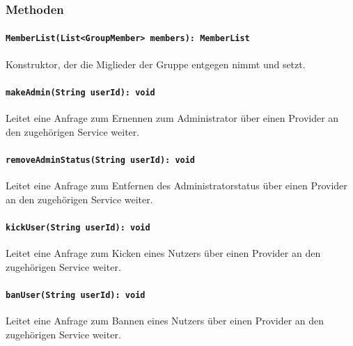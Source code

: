 \documentclass{entwurfsheft}
\begin{document}
\subsubsection*{Methoden}
\paragraph{\texttt{MemberList(List<GroupMember> members): MemberList}}
Konstruktor, der die Miglieder der Gruppe entgegen nimmt und setzt.
\paragraph{\texttt{makeAdmin(String userId): void}}
Leitet eine Anfrage zum Ernennen zum Administrator über einen Provider an den zugehörigen Service weiter.
\paragraph{\texttt{removeAdminStatus(String userId): void}}
Leitet eine Anfrage zum Entfernen des Administratorstatus über einen Provider an den zugehörigen Service weiter.
\paragraph{\texttt{kickUser(String userId): void}}
Leitet eine Anfrage zum Kicken eines Nutzers über einen Provider an den zugehörigen Service weiter.
\paragraph{\texttt{banUser(String userId): void}}
Leitet eine Anfrage zum Bannen eines Nutzers über einen Provider an den zugehörigen Service weiter.
\newpage
\end{document}
